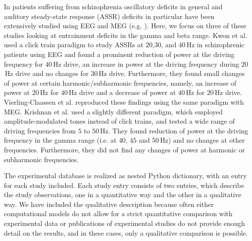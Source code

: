 \documentclass[a4paper,10pt]{article}
\begin{document}
In patients suffering from schizophrenia oscillatory deficits in general and auditory steady-state response (ASSR) deficits in particular have been extensively studied using EEG and MEG 
(e.g.  \cite{Kwon1999,Vierling2008,Krishnan2009,
Light2006,Zhang2016,Hamm2015,Brenner2003,Spencer2009b,Spencer2008,Spencer2012,OConnell2015, Mulert2011}). Here, we focus on three of these studies looking at
entrainment deficits in the gamma and beta range. Kwon et al. \cite{Kwon1999} used a click train paradigm to study ASSRs at $20$,$30$, and $40$\,Hz in schizophrenic
patients using EEG and found a prominent reduction of power at the driving frequency for $40$\,Hz drive, an increase in power at the driving frequency during $20$\,Hz drive and 
no changes for $30$\,Hz drive. Furthermore, they found small changes of power at certain harmonic/subharmonic frequencies, namely, an increase of power at $20$\,Hz for $40$\,Hz
drive and a decrease of power at $40$\,Hz for $20$\,Hz drive. Vierling-Claassen et al. \cite{Vierling2008} reproduced these findings using the same paradigm with MEG. 
Krishnan et al. \cite{Krishnan2009} used a slightly different paradigm, which employed amplitude-modulated tones instead of click trains, and tested a wide range of driving 
frequencies from $5$ to $50$\,Hz. They found reduction of power at the driving frequency in the gamma range (i.e. at $40$, $45$ and $50$\,Hz) and no changes at other frequencies.
Furthermore, they did not find any changes of power at harmonic or subharmonic frequencies. 

The experimental database is realized as nested Python dictionary, with an entry for each study included.
Each study entry consists of two entries, which describe the study observations, one in a quantitative way and the other in a qualitative way.
We have included the qualitative description because often either computational models do not allow for a strict quantitative comparison with 
experimental data or publications of experimental studies do not provide enough detail on the results, and in these cases, only a qualitative comparison is possible. 
\end{document}

